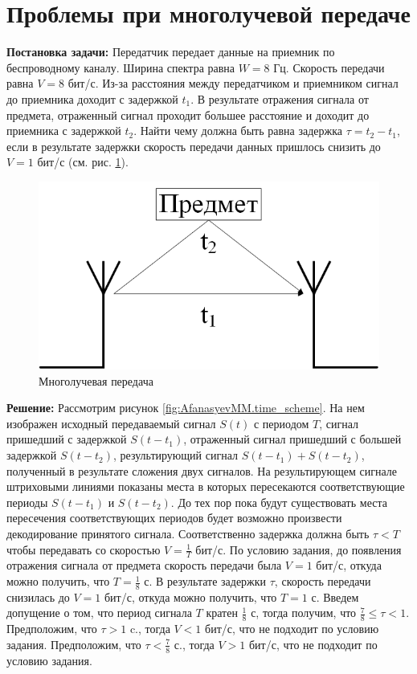 \section{Проблемы при многолучевой передаче}

\textbf{Постановка задачи:}
Передатчик передает данные на приемник по беспроводному каналу.
Ширина спектра равна $W=8$ Гц.
Скорость передачи равна $V=8$ бит/с.
Из-за расстояния между передатчиком и приемником сигнал до
приемника доходит с задержкой $t_1$.
В результате отражения сигнала от предмета, отраженный сигнал
проходит большее расстояние и доходит до приемника с задержкой $t_2$.
Найти чему должна быть равна задержка $\tau=t_2-t_1$, если в результате
задержки скорость передачи данных пришлось снизить до $V=1$ бит/с
(см. рис. \ref{fig:AfanasyevMM.structure_scheme}).

\begin{figure}[h]
	\centering
	\includegraphics[width=0.6\linewidth]{AfanasyevMM/img/structure_scheme}
	\caption{Многолучевая передача}
	\label{fig:AfanasyevMM.structure_scheme}
\end{figure}

\textbf{Решение:}
Рассмотрим рисунок \ref{fig:AfanasyevMM.time_scheme}.
На нем изображен исходный передаваемый сигнал $S(t)$ с периодом $T$,
сигнал пришедший с задержкой $S(t-t_1)$,
отраженный сигнал пришедший с большей задержкой $S(t-t_2)$,
результирующий сигнал $S(t-t_1)+S(t-t_2)$, полученный в результате
сложения двух сигналов.
На результирующем сигнале штриховыми линиями показаны места
в которых пересекаются соответствующие периоды $S(t-t_1)$ и $S(t-t_2)$.
До тех пор пока будут существовать места пересечения соответствующих
периодов будет возможно произвести декодирование принятого сигнала.
Соответственно задержка должна быть $\tau < T$ чтобы передавать
со скоростью $V= \frac{1}{T}$ бит/с.
По условию задания, до появления отражения сигнала от предмета
скорость передачи была $V=1$ бит/с, откуда можно получить, что
$T= \frac{1}{8}$ с.
В результате задержки $\tau$, скорость передачи
снизилась до $V=1$ бит/с, откуда можно получить, что $T=1$ с.
Введем допущение о том, что период сигнала $T$ кратен $\frac{1}{8}$ с,
тогда получим, что $\frac{7}{8} \leq \tau < 1$.
Предположим, что $\tau > 1$ c., тогда $V<1$ бит/с, что не подходит
по условию задания.
Предположим, что $\tau < \frac{7}{8}$ с., тогда $V>1$ бит/с, что
не подходит по условию задания.

